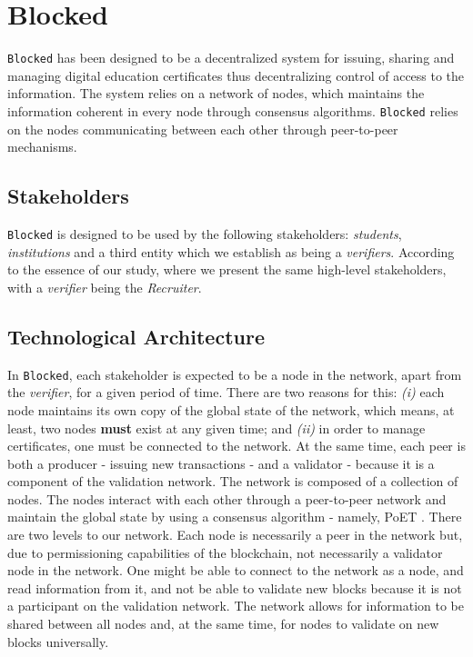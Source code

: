 \section{Blocked}
\label{chap:design}

\texttt{Blocked} has been designed to be a decentralized system for issuing, sharing and managing digital education certificates thus decentralizing control of access to the information. The system relies on a network of nodes, which maintains the information coherent in every node through consensus algorithms. \texttt{Blocked} relies on the nodes communicating between each other through peer-to-peer mechanisms.

\subsection{Stakeholders}
\label{sec:design-entities}

\texttt{Blocked} is designed to be used by the following stakeholders: \textit{students}, \textit{institutions} and a third entity which we establish as being a \textit{verifiers}. According to the essence of our study, where we present the same high-level stakeholders, with a \textit{verifier} being the \textit{Recruiter}.

\subsection{Technological Architecture}
\label{sec:design-architecture}

In \texttt{Blocked}, each stakeholder is expected to be a node in the network, apart from the \textit{verifier}, for a given period of time. There are two reasons for this: \emph{(i)} each node maintains its own copy of the global state of the network, which means, at least, two nodes \textbf{must} exist at any given time; and \emph{(ii)} in order to manage certificates, one must be connected to the network. At the same time, each peer is both a producer - issuing new transactions - and a validator - because it is a component of the validation network. The network is composed of a collection of nodes. The nodes interact with each other through a peer-to-peer network and maintain the global state by using a consensus algorithm - namely, PoET \cite{intel_poet}. There are two levels to our network. Each node is necessarily a peer in the network but, due to permissioning capabilities of the blockchain, not necessarily a validator node in the network. One might be able to connect to the network as a node, and read information from it, and not be able to validate new blocks because it is not a participant on the validation network. The network allows for information to be shared between all nodes and, at the same time, for nodes to validate on new blocks universally.

